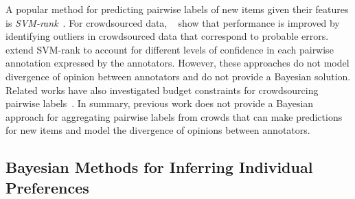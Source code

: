 A popular method for predicting pairwise labels of new items given their features is 
\emph{SVM-rank}~\cite{joachims2002optimizing}.
For crowdsourced data, ~\citet{fu2016robust} show that performance is improved by identifying outliers in crowdsourced data
that correspond to probable errors.
~\citet{uchida2017entity} extend SVM-rank to account for different levels of confidence in each pairwise annotation expressed
by the annotators.
However, these approaches do not model divergence of opinion between annotators
and do not provide a Bayesian solution.
Related works have also investigated budget constraints for crowdsourcing pairwise labels~\citep{cai2017pairwise}.
In summary, previous work does not 
provide a Bayesian approach for aggregating pairwise labels from crowds
that can make predictions for new items
and model the divergence of opinions between annotators.

\subsection{Bayesian Methods for Inferring Individual Preferences}

%

